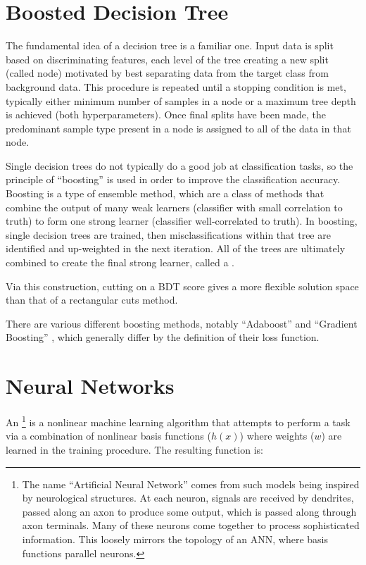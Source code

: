 \section{Boosted Decision Tree}

The fundamental idea of a decision tree is a familiar one. Input data is split based on discriminating features, each level of the tree creating a new split (called node) motivated by best separating data from the target class from background data. This procedure is repeated until a stopping condition is met, typically either minimum number of samples in a node or a maximum tree depth is achieved (both hyperparameters). Once final splits have been made, the predominant sample type present in a node is assigned to all of the data in that node.

Single decision trees do not typically do a good job at classification tasks, so the principle of ``boosting'' is used in order to improve the classification accuracy. Boosting is a type of ensemble method, which are a class of methods that combine the output of many weak learners (classifier with small correlation to truth) to form one strong learner (classifier well-correlated to truth). In boosting, single decision trees are trained, then misclassifications within that tree are identified and up-weighted in the next iteration. All of the trees are ultimately combined to create the final strong learner, called a . 

Via this construction, cutting on a \gls{BDT} score gives a more flexible solution space than that of a rectangular cuts method.

There are various different boosting methods, notably ``Adaboost'' \cite{adaboost} and ``Gradient Boosting'' \cite{gradBoost}, which generally differ by the definition of their loss function.


\section{Neural Networks}

An \footnote{The name ``Artificial Neural Network'' comes from such models being inspired by neurological structures. At each neuron, signals are received by dendrites, passed along an axon to produce some output, which is passed along through axon terminals. Many of these neurons come together to process sophisticated information. This loosely mirrors the topology of an \gls{ANN}, where basis functions parallel neurons.} is a nonlinear machine learning algorithm that attempts to perform a task via a combination of nonlinear basis functions ($h(x)$) where weights ($w$) are learned in the training procedure. The resulting function is:

